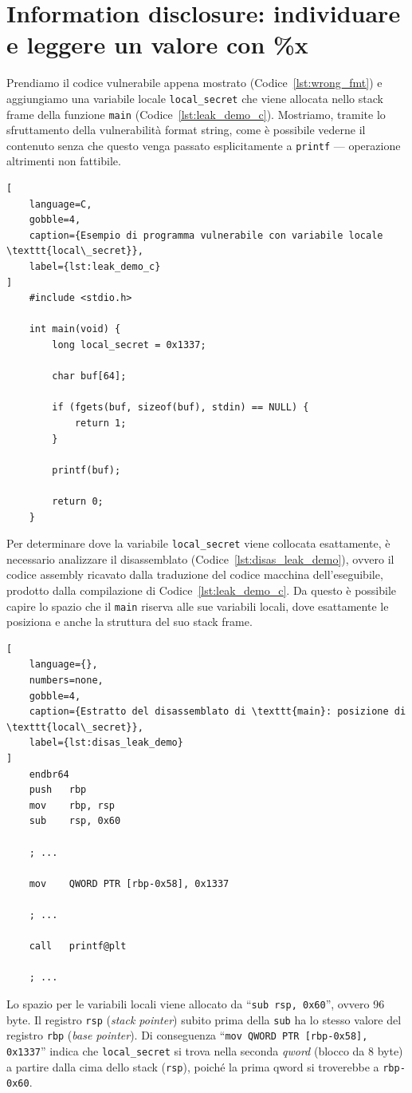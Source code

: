 \section{Information disclosure: individuare e leggere un valore con \%x}\label{sec:info_disclosure}
Prendiamo il codice vulnerabile appena mostrato (Codice~\ref{lst:wrong_fmt}) e aggiungiamo una variabile locale \texttt{local\_secret} che viene allocata nello stack frame della funzione \texttt{main} (Codice~\ref{lst:leak_demo_c}).
Mostriamo, tramite lo sfruttamento della vulnerabilità format string, come è possibile vederne il contenuto senza che questo venga passato esplicitamente a \texttt{printf} --- operazione altrimenti non fattibile.
\begin{lstlisting}[
    language=C,
    gobble=4,
    caption={Esempio di programma vulnerabile con variabile locale \texttt{local\_secret}},
    label={lst:leak_demo_c}
]
    #include <stdio.h>

    int main(void) {
        long local_secret = 0x1337;

        char buf[64];

        if (fgets(buf, sizeof(buf), stdin) == NULL) {
            return 1;
        }

        printf(buf);

        return 0;
    }
\end{lstlisting}

Per determinare dove la variabile \texttt{local\_secret} viene collocata esattamente, è necessario analizzare il disassemblato (Codice~\ref{lst:disas_leak_demo}), ovvero il codice assembly ricavato dalla traduzione del codice macchina dell'eseguibile, prodotto dalla compilazione di Codice~\ref{lst:leak_demo_c}. Da questo è possibile capire lo spazio che il \texttt{main} riserva alle sue variabili locali, dove esattamente le posiziona e anche la struttura del suo stack frame.
\begin{lstlisting}[
    language={},
    numbers=none,
    gobble=4,
    caption={Estratto del disassemblato di \texttt{main}: posizione di \texttt{local\_secret}},
    label={lst:disas_leak_demo}
]
    endbr64
    push   rbp
    mov    rbp, rsp
    sub    rsp, 0x60
    
    ; ...
    
    mov    QWORD PTR [rbp-0x58], 0x1337
    
    ; ...
    
    call   printf@plt
    
    ; ...
\end{lstlisting}
Lo spazio per le variabili locali viene allocato da ``\texttt{sub rsp, 0x60}'', ovvero 96 byte.
Il registro \texttt{rsp} (\emph{stack pointer}) subito prima della \texttt{sub} ha lo stesso valore del registro \texttt{rbp} (\emph{base pointer}). Di conseguenza ``\texttt{mov QWORD PTR [rbp-0x58], 0x1337}'' indica che \texttt{local\_secret} si trova nella seconda \emph{qword} (blocco da 8 byte) a partire dalla cima dello stack (\texttt{rsp}), poiché la prima qword si troverebbe a \texttt{rbp-0x60}.

